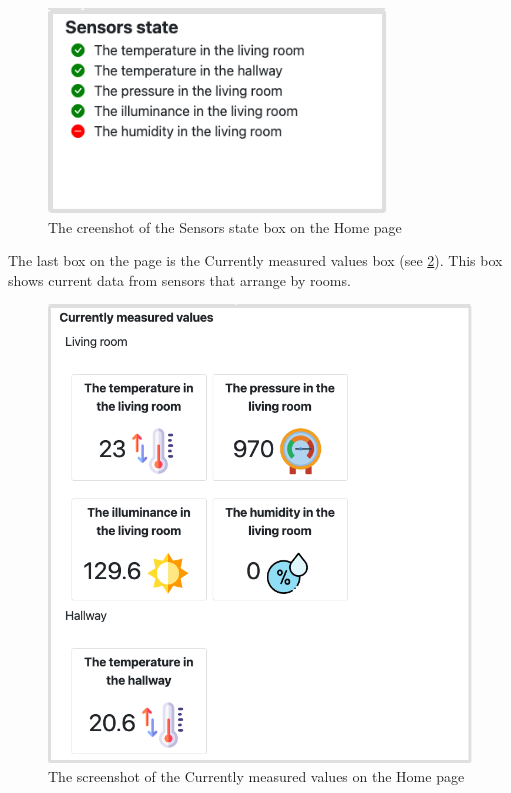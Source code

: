 \begin{figure}[H]
    \centering
    \includegraphics[width=0.8\textwidth]{img/screenshot_home_sensors_state.png}
    \caption{The creenshot of the Sensors state box on the Home page}
    \label{fig:screenshot_home_sensors_state}
\end{figure}

The last box on the page is the Currently measured values box (see \cref{fig:screenshot_home_currently_measured_values}). This box shows current data from sensors that arrange by rooms.

\begin{figure}[H]
    \centering
    \includegraphics[width=\textwidth]{img/screenshot_home_currently_measured_values.png}
    \caption{The screenshot of the Currently measured values on the Home page}
    \label{fig:screenshot_home_currently_measured_values}
\end{figure}

